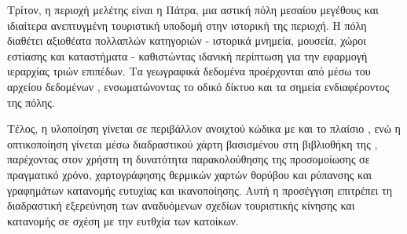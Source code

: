 Τρίτον, η περιοχή μελέτης είναι η Πάτρα, μια αστική πόλη μεσαίου
μεγέθους και ιδιαίτερα ανεπτυγμένη τουριστική υποδομή στην ιστορική
της περιοχή. Η πόλη διαθέτει αξιοθέατα πολλαπλών κατηγοριών - ιστορικά
μνημεία, μουσεία, χώροι εστίασης και καταστήματα - καθιστώντας ιδανική
περίπτωση για την εφαρμογή ιεραρχίας  τριών επιπέδων. Τα
γεωγραφικά δεδομένα προέρχονται από  μέσω του
αρχείου δεδομένων , ενσωματώνοντας το οδικό δίκτυο
και τα σημεία ενδιαφέροντος της πόλης.

Τέλος, η υλοποίηση γίνεται σε περιβάλλον ανοιχτού κώδικα με 
και το πλαίσιο , ενώ η οπτικοποίηση γίνεται μέσω διαδραστικού
χάρτη βασισμένου στη βιβλιοθήκη  της ,
παρέχοντας στον χρήστη τη δυνατότητα παρακολούθησης της προσομοίωσης σε
πραγματικό χρόνο, χαρτογράφησης θερμικών χαρτών θορύβου και ρύπανσης
και γραφημάτων κατανομής ευτυχίας και ικανοποίησης. Αυτή η προσέγγιση
επιτρέπει τη διαδραστική εξερεύνηση των αναδυόμενων σχεδίων τουριστικής
κίνησης και κατανομής σε σχέση με την ευτθχία των κατοίκων.
